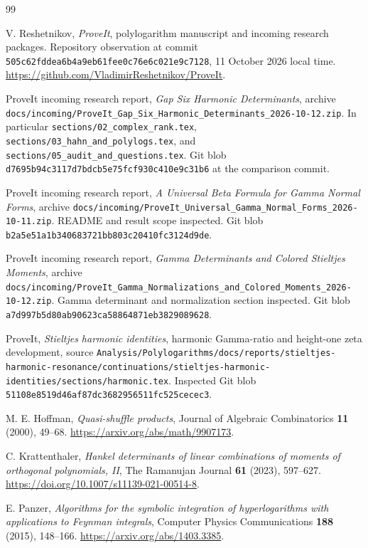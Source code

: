 \documentclass[11pt,letterpaper]{article}
\numberwithin{equation}{section}
\theoremstyle{definition}\newtheorem{definition}[theorem]{Definition}
\theoremstyle{remark}\newtheorem{remark}[theorem]{Remark}
\newcommand{\src}[1]{\nolinkurl{#1}}
\begin{document}
\begin{thebibliography}{99}
\small
\setlength{\itemsep}{3pt}

V. Reshetnikov, \emph{ProveIt}, polylogarithm manuscript and incoming
research packages. Repository observation at commit
\src{505c62fddea6b4a9eb61fee0c76e6c021e9c7128}, 11 October 2026 local time.
\url{https://github.com/VladimirReshetnikov/ProveIt}.

ProveIt incoming research report, \emph{Gap Six Harmonic Determinants},
archive \src{docs/incoming/ProveIt_Gap_Six_Harmonic_Determinants_2026-10-12.zip}.
In particular \src{sections/02_complex_rank.tex},
\src{sections/03_hahn_and_polylogs.tex}, and
\src{sections/05_audit_and_questions.tex}. Git blob
\src{d7695b94c3117d7bdcb5e75fcf930c410e9c31b6} at the comparison commit.

ProveIt incoming research report, \emph{A Universal Beta Formula for
Gamma Normal Forms}, archive
\src{docs/incoming/ProveIt_Universal_Gamma_Normal_Forms_2026-10-11.zip}.
README and result scope inspected. Git blob
\src{b2a5e51a1b340683721bb803c20410fc3124d9de}.

ProveIt incoming research report, \emph{Gamma Determinants and Colored
Stieltjes Moments}, archive
\src{docs/incoming/ProveIt_Gamma_Normalizations_and_Colored_Moments_2026-10-12.zip}.
Gamma determinant and normalization section inspected. Git blob
\src{a7d997b5d80ab90623ca58864871eb3829089628}.

ProveIt, \emph{Stieltjes harmonic identities}, harmonic Gamma-ratio and
height-one zeta development, source
\src{Analysis/Polylogarithms/docs/reports/stieltjes-harmonic-resonance/continuations/stieltjes-harmonic-identities/sections/harmonic.tex}.
Inspected Git blob \src{51108e8519d46af87dc3682956511fc525cecec3}.

M. E. Hoffman, \emph{Quasi-shuffle products}, Journal of Algebraic
Combinatorics \textbf{11} (2000), 49--68.
\url{https://arxiv.org/abs/math/9907173}.

C. Krattenthaler, \emph{Hankel determinants of linear combinations of
moments of orthogonal polynomials, II}, The Ramanujan Journal
\textbf{61} (2023), 597--627.
\url{https://doi.org/10.1007/s11139-021-00514-8}.

E. Panzer, \emph{Algorithms for the symbolic integration of
hyperlogarithms with applications to Feynman integrals}, Computer
Physics Communications \textbf{188} (2015), 148--166.
\url{https://arxiv.org/abs/1403.3385}.


\end{thebibliography}
\end{document}
